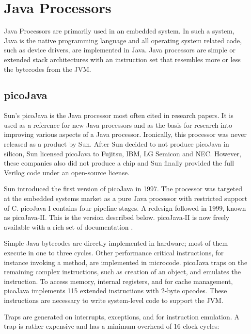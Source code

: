 \section{Java Processors}

Java Processors are primarily used in an embedded system. In such a
system, Java is the native programming language and all operating
system related code, such as device drivers, are implemented in
Java. Java processors are simple or extended stack architectures
with an instruction set that resembles more or less the bytecodes
from the JVM.

\subsection{picoJava}
\label{subsec:related:picojava}

Sun's picoJava is the Java processor most often cited in research
papers. It is used as a reference for new Java processors and as the
basis for research into improving various aspects of a Java
processor. Ironically, this processor was never released as a
product by Sun. After Sun decided to not produce picoJava in
silicon, Sun licensed picoJava to Fujitsu, IBM, LG Semicon and NEC.
However, these companies also did not produce a chip and Sun finally
provided the full Verilog code under an open-source license.

Sun introduced the first version of picoJava \cite{pJ1} in 1997. The
processor was targeted at the embedded systems market as a pure Java
processor with restricted support of C. picoJava-I contains four
pipeline stages. A redesign followed in 1999, known as picoJava-II.
This is the version described below. picoJava-II is now freely
available with a rich set of documentation \cite{pjMicroArch,
pjProgRef}.

Simple Java bytecodes are directly implemented in hardware; most of
them execute in one to three cycles. Other performance critical
instructions, for instance invoking a method, are implemented in
microcode. picoJava traps on the remaining complex instructions, such
as creation of an object, and emulates the instruction. To access
memory, internal registers, and for cache management, picoJava
implements 115 extended instructions with 2-byte opcodes. These
instructions are necessary to write system-level code to support the
JVM.

Traps are generated on interrupts, exceptions, and for instruction
emulation. A trap is rather expensive and has a minimum overhead of
16 clock cycles:

